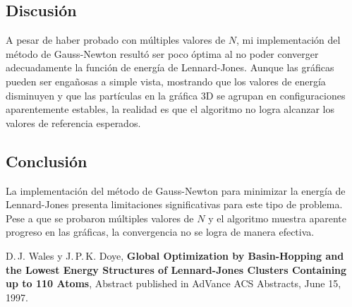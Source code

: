 \documentclass{article}
\begin{document}
\subsection{Discusión}

A pesar de haber probado con múltiples valores de $N$, mi implementación del método de Gauss-Newton resultó ser poco óptima al no poder converger adecuadamente la función de energía de Lennard-Jones. Aunque las gráficas pueden ser engañosas a simple vista, mostrando que los valores de energía disminuyen y que las partículas en la gráfica 3D se agrupan en configuraciones aparentemente estables, la realidad es que el algoritmo no logra alcanzar los valores de referencia esperados.

\subsection{Conclusión}

La implementación del método de Gauss-Newton para minimizar la energía de Lennard-Jones presenta limitaciones significativas para este tipo de problema. Pese a que se probaron múltiples valores de $N$ y el algoritmo muestra aparente progreso en las gráficas, la convergencia no se logra de manera efectiva. 


\begin{thebibliography}{9}
D.\,J. Wales y J.\,P.\,K. Doye,
\textbf{Global Optimization by Basin-Hopping and the Lowest Energy Structures of Lennard-Jones Clusters Containing up to 110 Atoms}, Abstract published in AdVance ACS Abstracts, June 15, 1997.
\end{thebibliography}
\end{document}
